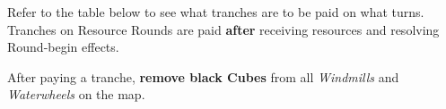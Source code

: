 \begin{multicols*}{2}
    Refer to the table below to see what tranches are to be paid on what turns. Tranches on Resource Rounds are paid \textbf{after} receiving resources and resolving Round-begin effects.

    After paying a tranche, \textbf{remove black Cubes} from all \textit{Windmills} and \textit{Waterwheels} on the map.


\end{multicols*}
